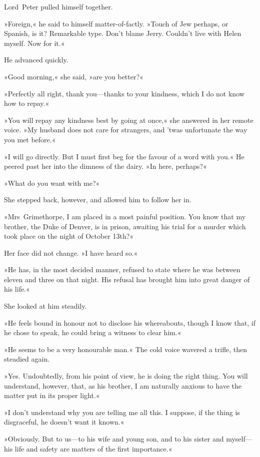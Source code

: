 Lord~Peter pulled himself together.

»Foreign,« he said to himself matter-of-factly. »Touch of Jew perhaps, or Spanish, is it? Remarkable type. Don't blame Jerry. Couldn't live with Helen myself. Now for it.«

He advanced quickly.

»Good morning,« she said, »are you better?«

»Perfectly all right, thank you—thanks to your kindness, which I do not know how to repay.«

»You will repay any kindness best by going at once,« she answered in her remote voice. »My husband does not care for strangers, and 'twas unfortunate the way you met before.«

»I will go directly. But I must first beg for the favour of a word with you.« He peered past her into the dimness of the dairy. »In here, perhaps?«

»What do you want with me?«

She stepped back, however, and allowed him to follow her in.

»Mrs~Grimethorpe, I am placed in a most painful position. You know that my brother, the Duke of Denver, is in prison, awaiting his trial for a murder which took place on the night of October 13th?«

Her face did not change. »I have heard so.«

»He has, in the most decided manner, refused to state where he was between eleven and three on that night. His refusal has brought him into great danger of his life.«

She looked at him steadily.

»He feels bound in honour not to disclose his whereabouts, though I know that, if he chose to speak, he could bring a witness to clear him.«

»He seems to be a very honourable man.« The cold voice wavered a trifle, then steadied again.

»Yes. Undoubtedly, from his point of view, he is doing the right thing. You will understand, however, that, as his brother, I am naturally anxious to have the matter put in its proper light.«

»I don't understand why you are telling me all this. I suppose, if the thing is disgraceful, he doesn't want it known.«

»Obviously. But to us—to his wife and young son, and to his sister and myself—his life and safety are matters of the first importance.«

